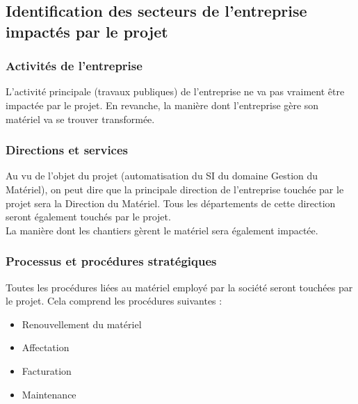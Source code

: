 \subsection{Identification des secteurs de l'entreprise impactés par le projet}

\subsubsection{Activités de l'entreprise}

L'activité principale (travaux publiques) de l'entreprise ne va pas
vraiment être impactée par le projet. En revanche, la manière dont
l'entreprise gère son matériel va se trouver transformée.


\subsubsection{Directions et services}

Au vu de l'objet du projet (automatisation du SI du domaine Gestion du
Matériel), on peut dire que la principale direction de l'entreprise touchée
par le projet sera la Direction du Matériel. Tous les départements de cette
direction seront également touchés par le projet.\\
La manière dont les chantiers gèrent le matériel sera également impactée.


\subsubsection{Processus et procédures stratégiques}

Toutes les procédures liées au matériel employé par la société seront
touchées par le projet. Cela comprend les procédures suivantes :
\begin{itemize}
\item Renouvellement du matériel
\item Affectation
\item Facturation
\item Maintenance
\end{itemize}
